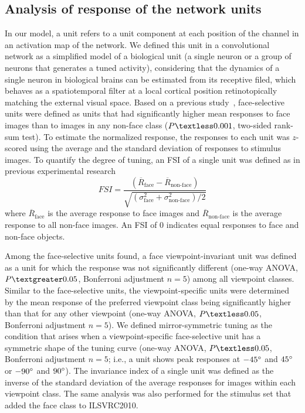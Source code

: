\documentclass[sn-mathphys]{sn-jnl}%
\theoremstyle{thmstyleone}%
\theoremstyle{thmstyletwo}%
\theoremstyle{thmstylethree}%
\begin{document}
\subsection{Analysis of response of the network units}
In our model, a unit refers to a unit component at each position of the channel in an activation map of the network.
We defined this unit in a convolutional network as a simplified model of a biological unit (a single neuron or a group of neurons that generates a tuned activity), considering that the dynamics of a single neuron in biological brains can be estimated from its receptive filed, 
which behaves as a spatiotemporal filter at a local cortical position retinotopically matching the external visual space.
Based on a previous study~\cite{grossman2019convergent}, face-selective units were defined as units that had significantly higher mean responses to face images than to images in any non-face class ($ P \textless 0.001 $, two-sided rank-sum test).
To estimate the normalized response, the responses to each unit was $ z $-scored using the average and the standard deviation of responses to stimulus images.
To quantify the degree of tuning, an FSI of a single unit was defined as in previous experimental research~\cite{aparicio2016neurophysiological}
\begin{equation}\label{eq:fsi}
	FSI = \frac{(\overline{R}_\textrm{face} - \overline{R}_\textrm{non-face})}
	{\sqrt{(\sigma^2_\textrm{face} + \sigma^2_\textrm{non-face}) / 2}}
\end{equation}
where $ \overline{R}_\textrm{face} $ is the average response to face images 
and $ \overline{R}_\textrm{non-face} $ is the average response to all non-face images.
An FSI of 0 indicates equal responses to face and non-face objects.


Among the face-selective units found, a face viewpoint-invariant unit was defined as a unit for which the response was not significantly different (one-way ANOVA, $ P \textgreater 0.05 $, Bonferroni adjustment $ n = 5 $) among all viewpoint classes.
Similar to the face-selective units, the viewpoint-specific units were determined by the mean response of the preferred viewpoint class being significantly higher than that for any other viewpoint (one-way ANOVA, $ P \textless 0.05 $, Bonferroni adjustment $ n = 5 $).
We defined mirror-symmetric tuning as the condition that arises when a viewpoint-specific face-selective unit has a symmetric shape of the tuning curve (one-way ANOVA, $ P \textless 0.05 $, Bonferroni adjustment $ n = 5 $; i.e., a unit shows peak responses at $ -45\degree $ and $ 45\degree $ or $ -90\degree $ and $ 90\degree $).
The invariance index of a single unit was defined as the inverse of the standard deviation of the average responses for images within each viewpoint class.
The same analysis was also performed for the stimulus set that added the face class to ILSVRC2010.
\end{document}
